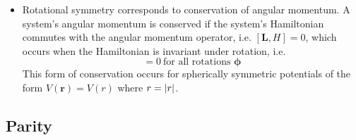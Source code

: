 \documentclass[11pt, a4paper]{article}
\newcommand{\Ham}{Hamiltonian\xspace}
\renewcommand{\vec}[1]{\bm{#1}} %
\renewcommand{\r}{\vec{r}}  %
\begin{document}
\begin{itemize}
	\item Rotational symmetry corresponds to conservation of angular momentum. A system's angular momentum is conserved if the system's Hamiltonian commutes with the angular momentum operator, i.e. $ [\vec{L}, H] = 0 $, which occurs when the \Ham is invariant under rotation, i.e.
	\begin{equation*}
		[U(\vec{\phi}), H] = 0 \ \text{for all rotations } \vec{\phi}
	\end{equation*}
	This form of conservation occurs for spherically symmetric potentials of the form $ V(\r) = V(r) $ where $ r = \abs{r} $. 
\end{itemize}

\subsection{Parity}
\end{document}
